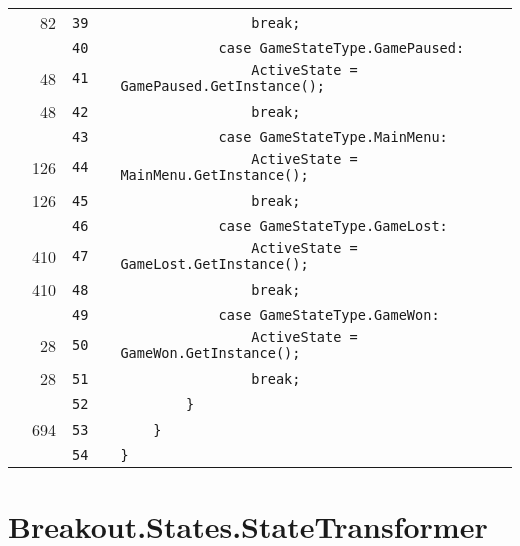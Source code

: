 \documentclass[a4paper,landscape,10pt]{article}
\begin{document}
\begin{longtable}[l]{lrrll}
\cellcolor{green} & 82 & \verb~39~ & & \verb~                break;~\\
\cellcolor{gray} &  & \verb~40~ & & \verb~            case GameStateType.GamePaused:~\\
\cellcolor{green} & 48 & \verb~41~ & & \verb~                ActiveState = GamePaused.GetInstance();~\\
\cellcolor{green} & 48 & \verb~42~ & & \verb~                break;~\\
\cellcolor{gray} &  & \verb~43~ & & \verb~            case GameStateType.MainMenu:~\\
\cellcolor{green} & 126 & \verb~44~ & & \verb~                ActiveState = MainMenu.GetInstance();~\\
\cellcolor{green} & 126 & \verb~45~ & & \verb~                break;~\\
\cellcolor{gray} &  & \verb~46~ & & \verb~            case GameStateType.GameLost:~\\
\cellcolor{green} & 410 & \verb~47~ & & \verb~                ActiveState = GameLost.GetInstance();~\\
\cellcolor{green} & 410 & \verb~48~ & & \verb~                break;~\\
\cellcolor{gray} &  & \verb~49~ & & \verb~            case GameStateType.GameWon:~\\
\cellcolor{green} & 28 & \verb~50~ & & \verb~                ActiveState = GameWon.GetInstance();~\\
\cellcolor{green} & 28 & \verb~51~ & & \verb~                break;~\\
\cellcolor{gray} &  & \verb~52~ & & \verb~        }~\\
\cellcolor{green} & 694 & \verb~53~ & & \verb~    }~\\
\cellcolor{gray} &  & \verb~54~ & & \verb~}~\\
\end{longtable}
\newpage
\section{Breakout.States.StateTransformer}
\end{document}
